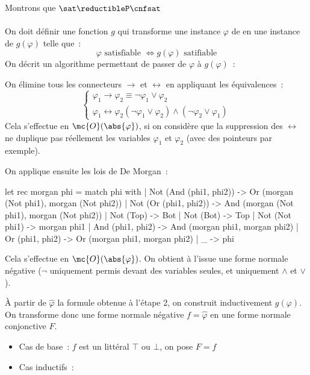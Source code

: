 \begin{demonstration}
    Montrons que $\sat \reductibleP \cnfsat$\\\\
    On doit définir une fonction $g$ qui transforme une instance $\varphi$ de \sat en une instance de \cnfsat $g(\varphi)$ telle que~:
    $$\varphi \text{ satisfiable } \Leftrightarrow g(\varphi) \text{ satifiable}$$
    On décrit un algorithme permettant de passer de $\varphi$ à $g(\varphi)$~:
    \begin{enumeratebf}
        \item On élimine tous les connecteurs $\rightarrow$ et $\leftrightarrow$ en appliquant les équivalences~:
        $$\begin{cases*}
            \varphi_1 \rightarrow \varphi_2 \equiv \lnot \varphi_1 \vee \varphi_2\\
            \varphi_1 \leftrightarrow \varphi_2 (\lnot \varphi_1 \vee \varphi_2) \wedge (\lnot \varphi_2 \vee \varphi_1)
        \end{cases*}$$
        Cela s'effectue en $\mc{O}(\abs{\varphi})$, si on considère que la suppression des $\leftrightarrow$ ne duplique pas réellement les variables $\varphi_1$ et $\varphi_2$ (avec des pointeurs par exemple).
        \item On applique ensuite les lois de De Morgan~:
    \begin{lstOCaml}
    let rec morgan phi =
        match phi with
        | Not (And (phi1, phi2)) -> Or (morgan (Not phi1), morgan (Not phi2))
        | Not (Or (phi1, phi2)) -> And (morgan (Not phi1), morgan (Not phi2))
        | Not (Top) -> Bot
        | Not (Bot) -> Top
        | Not (Not phi1) -> morgan phi1
        | And (phi1, phi2) -> And (morgan phi1, morgan phi2)
        | Or (phi1, phi2) -> Or (morgan phi1, morgan phi2)
        | _ -> phi
    \end{lstOCaml}
    Cela s'effectue en $\mc{O}(\abs{\varphi})$. On obtient à l'issue une forme normale négative ($\lnot$ uniquement permis devant des variables seules, et uniquement $\wedge$ et $\vee$).
    \item  À partir de $\hat{\varphi}$ la formule obtenue à l'étape 2, on construit inductivement $g(\varphi)$. On transforme donc une forme normale négative $f = \hat{\varphi}$ en une forme normale conjonctive $F$.
    \begin{itemize}
        \item Cas de base~: $f$ est un littéral $\top$ ou $\bot$, on pose $F = f$
        \item Cas inductifs~:

\end{itemize}
\end{enumeratebf}
\end{demonstration}
